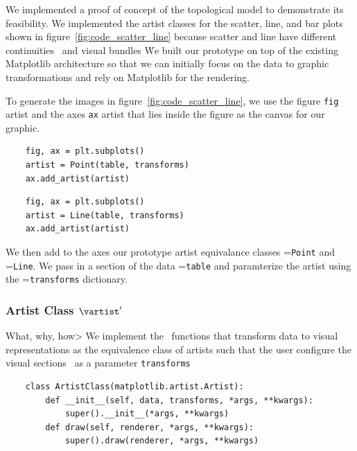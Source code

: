 \documentclass[../main.tex]{subfiles}
\begin{document}
We implemented a proof of concept of the topological model to demonstrate its feasibility. We implemented the artist classes for the scatter, line, and bar plots shown in figure~\ref{fig:code_scatter_line} because scatter and line have different continuities \gbase\ and visual bundles \vtotal\. We built our prototype on top of the existing Matplotlib architecture \cite{hunterMatplotlib2DGraphics2007,hunterArchitectureOpenSource} so that we can initially focus on the data to graphic transformations and rely on Matplotlib for the rendering. 

To generate the images in figure~\ref{fig:code_scatter_line}, we use the figure \texttt{fig}  artist and the axes \texttt{ax} artist that lies inside the figure as the canvas for our graphic. 

\begin{multicols*}{2}
\begin{verbatim}
    fig, ax = plt.subplots()
    artist = Point(table, transforms)
    ax.add_artist(artist)
\end{verbatim}
\columnbreak
\begin{verbatim}
    fig, ax = plt.subplots()
    artist = Line(table, transforms)
    ax.add_artist(artist)
\end{verbatim}
\end{multicols*}
 We then add to the axes our prototype artist equivalance classes \vartisteq=\texttt{Point} and  \vartisteq=\texttt{Line}. We pass in a section of the data \dsection=\texttt{table} and  paramterize the artist using the \vchannel=\texttt{transforms} dictionary. 
 
\subsubsection{Artist Class $\vartist^{\prime}$}
What, why, how>
We implement the \vartist\ functions that transform data to visual representations as the equivalence class of artists such that the user configure the visual sections \vsection\ as a parameter \texttt{transforms}


\begin{verbatim}
    class ArtistClass(matplotlib.artist.Artist):
        def __init__(self, data, transforms, *args, **kwargs):
            super().__init__(*args, **kwargs)
        def draw(self, renderer, *args, **kwargs):
            super().draw(renderer, *args, **kwargs)
\end{verbatim}
\end{document}
